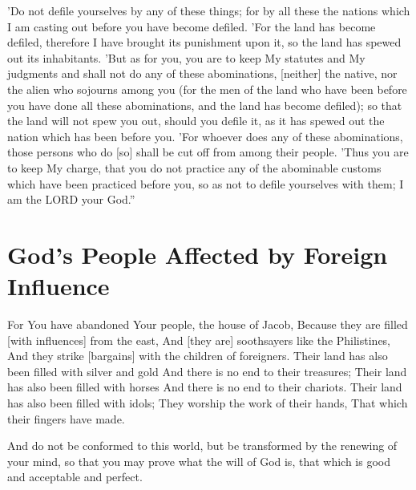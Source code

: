 \vspace{2\baselineskip}

\begin{scripture}[Leviticus 18:24-30]
    'Do not defile yourselves by any of these things; for by all these the nations which I am casting out before you have become defiled.
    'For the land has become defiled, therefore I have brought its punishment upon it, so the land has spewed out its inhabitants.
    'But as for you, you are to keep My statutes and My judgments and shall not do any of these abominations, [neither] the native, nor the alien who sojourns among you
    (for the men of the land who have been before you have done all these abominations, and the land has become defiled);
    so that the land will not spew you out, should you defile it, as it has spewed out the nation which has been before you.
    'For whoever does any of these abominations, those persons who do [so] shall be cut off from among their people.
    'Thus you are to keep My charge, that you do not practice any of the abominable customs which have been practiced before you, so as not to defile yourselves with them; I am the LORD your God.''
\end{scripture}

\section{God's People Affected by Foreign Influence}

\begin{scripture}[Isaiah 2:6-8]
    For You have abandoned Your people, the house of Jacob, Because they are filled [with influences] from the east, And [they are] soothsayers like the Philistines, And they strike [bargains] with the children of foreigners.
    Their land has also been filled with silver and gold And there is no end to their treasures; Their land has also been filled with horses And there is no end to their chariots.
    Their land has also been filled with idols; They worship the work of their hands, That which their fingers have made.
\end{scripture}

\vspace{2\baselineskip}

\begin{scripture}[Romans 12:2]
     
    And do not be conformed to this world, but be transformed by the renewing of your mind, so that you may prove what the will of God is, that which is good and acceptable and perfect.
\end{scripture}

